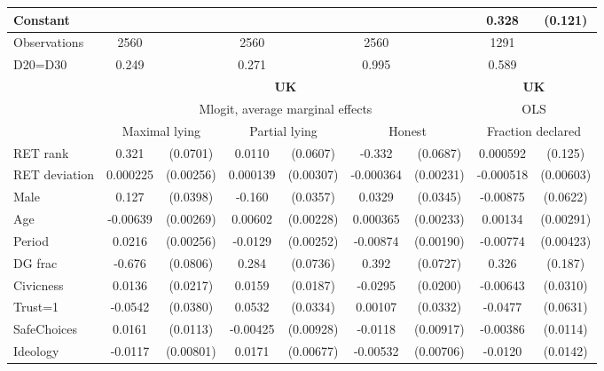 \begin{tabular}{l|cccccc|cc}
Constant        &                  &         &                  &         &                  &         &    0.328\sym{***}&  (0.121)\\
\hline
Observations    &     2560         &         &     2560         &         &     2560         &         &     1291         &         \\
D20=D30         &    0.249         &         &    0.271         &         &    0.995         &         &    0.589         &         \\
\hline\hline
&\multicolumn{6}{c|}{\bf UK}&\multicolumn{2}{c}{\bf UK}\\ &\multicolumn{6}{c|}{Mlogit, average marginal effects }&\multicolumn{2}{c}{OLS}\\
                &\multicolumn{2}{c}{Maximal lying}&\multicolumn{2}{c}{Partial lying}&\multicolumn{2}{c}{Honest}  &\multicolumn{2}{c}{Fraction declared}\\
\hline
RET rank        &    0.321\sym{***}& (0.0701)&   0.0110         & (0.0607)&   -0.332\sym{***}& (0.0687)& 0.000592         &  (0.125)\\
RET deviation   & 0.000225         &(0.00256)& 0.000139         &(0.00307)&-0.000364         &(0.00231)&-0.000518         &(0.00603)\\
Male            &    0.127\sym{***}& (0.0398)&   -0.160\sym{***}& (0.0357)&   0.0329         & (0.0345)& -0.00875         & (0.0622)\\
Age             & -0.00639\sym{**} &(0.00269)&  0.00602\sym{***}&(0.00228)& 0.000365         &(0.00233)&  0.00134         &(0.00291)\\
Period          &   0.0216\sym{***}&(0.00256)&  -0.0129\sym{***}&(0.00252)& -0.00874\sym{***}&(0.00190)& -0.00774\sym{*}  &(0.00423)\\
DG frac         &   -0.676\sym{***}& (0.0806)&    0.284\sym{***}& (0.0736)&    0.392\sym{***}& (0.0727)&    0.326\sym{*}  &  (0.187)\\
Civicness       &   0.0136         & (0.0217)&   0.0159         & (0.0187)&  -0.0295         & (0.0200)& -0.00643         & (0.0310)\\
Trust=1         &  -0.0542         & (0.0380)&   0.0532         & (0.0334)&  0.00107         & (0.0332)&  -0.0477         & (0.0631)\\
SafeChoices     &   0.0161         & (0.0113)& -0.00425         &(0.00928)&  -0.0118         &(0.00917)& -0.00386         & (0.0114)\\
Ideology        &  -0.0117         &(0.00801)&   0.0171\sym{**} &(0.00677)& -0.00532         &(0.00706)&  -0.0120         & (0.0142)\\

\end{tabular}
